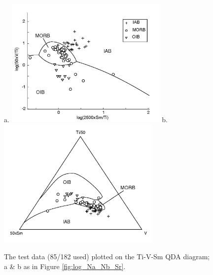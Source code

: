 \begin{figure}[htbp]
  \centering
a.  \includegraphics[width=300]{figures/log_Ti_V_Sm_q.jpg}
b.  \includegraphics[width=300]{figures/test_Ti_V_Sm_q.jpg}
  \caption[The test data plotted on the Ti-V-Sm diagram]
{The test data (85/182 used) plotted on the Ti-V-Sm QDA diagram;  a \&
b as in Figure \ref{fig:log_Na_Nb_Sr}.}
  \label{fig:log_Ti_V_Sm}
\end{figure}
